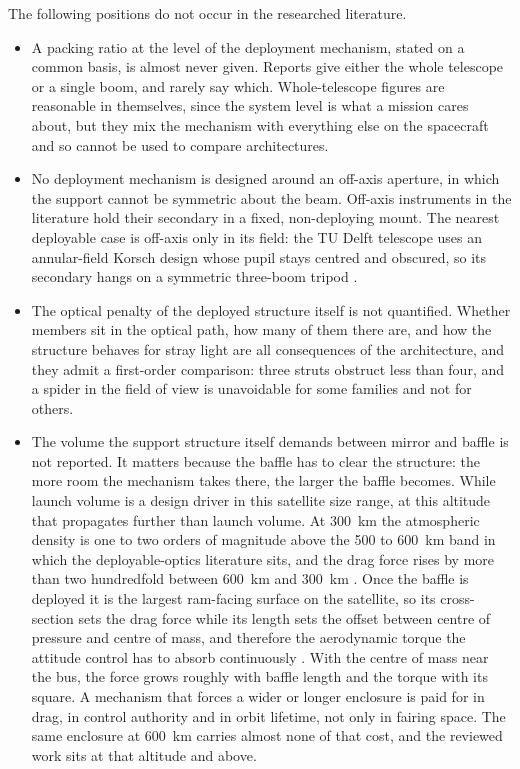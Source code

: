 The following positions do not occur in the researched literature.

\begin{itemize}
    \item A packing ratio at the level of the deployment mechanism, stated on a common basis, is almost never given. Reports give either the whole telescope or a single boom, and rarely say which. Whole-telescope figures are reasonable in themselves, since the system level is what a mission cares about, but they mix the mechanism with everything else on the spacecraft and so cannot be used to compare architectures.

    \item No deployment mechanism is designed around an off-axis aperture, in which the support cannot be symmetric about the beam. Off-axis instruments in the literature hold their secondary in a fixed, non-deploying mount. The nearest deployable case is off-axis only in its field: the TU Delft telescope uses an annular-field Korsch design whose pupil stays centred and obscured, so its secondary hangs on a symmetric three-boom tripod \cite{dolkens_deployable_2017}.

    \item The optical penalty of the deployed structure itself is not quantified. Whether members sit in the optical path, how many of them there are, and how the structure behaves for stray light are all consequences of the architecture, and they admit a first-order comparison: three struts obstruct less than four, and a spider in the field of view is unavoidable for some families and not for others.

    \item The volume the support structure itself demands between mirror and baffle is not reported. It matters because the baffle has to clear the structure: the more room the mechanism takes there, the larger the baffle becomes. While launch volume is a design driver in this satellite size range, at this altitude that propagates further than launch volume. At \SI{300}{\kilo\meter} the atmospheric density is one to two orders of magnitude above the 500 to \SI{600}{\kilo\meter} band in which the deployable-optics literature sits, and the drag force rises by more than two hundredfold between \SI{600}{\kilo\meter} and \SI{300}{\kilo\meter} \cite{crisp_benefits_2020}. Once the baffle is deployed it is the largest ram-facing surface on the satellite, so its cross-section sets the drag force while its length sets the offset between centre of pressure and centre of mass, and therefore the aerodynamic torque the attitude control has to absorb continuously \cite{aslanov_vleo_2023}. With the centre of mass near the bus, the force grows roughly with baffle length and the torque with its square. A mechanism that forces a wider or longer enclosure is paid for in drag, in control authority and in orbit lifetime, not only in fairing space. The same enclosure at \SI{600}{\kilo\meter} carries almost none of that cost, and the reviewed work sits at that altitude and above.


\end{itemize}
